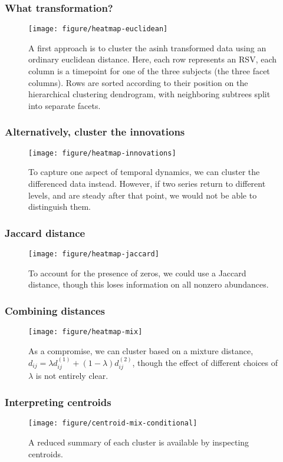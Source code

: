\documentclass{beamer}
\begin{document}
\begin{frame}
  \frametitle{What transformation?}
 \begin{figure}
   \centering
   \texttt{[image: figure/heatmap-euclidean]}
   \caption{A first approach is to cluster the asinh transformed data using an
     ordinary euclidean distance. Here, each row represents an RSV, each column
     is a timepoint for one of the three subjects (the three facet columns).
     Rows are sorted according to their position on the hierarchical
     clustering dendrogram, with neighboring subtrees split into separate
     facets. \label{fig:heatmap-euclidean}}
 \end{figure}
\end{frame}

\begin{frame}
  \frametitle{Alternatively, cluster the innovations}
 \begin{figure}[ht]
   \centering
   \texttt{[image: figure/heatmap-innovations]}
   \caption{To capture one aspect of temporal dynamics, we can cluster the
     differenced data instead. However, if two series return to different
     levels, and are steady after that point, we would not be able to
     distinguish them. \label{fig:heatmap-innovations} }
 \end{figure}
\end{frame}

\begin{frame}
  \frametitle{Jaccard distance}
 \begin{figure}[ht]
   \centering
   \texttt{[image: figure/heatmap-jaccard]}
   \caption{To account for the presence of zeros, we could use a Jaccard
     distance, though this loses information on all nonzero abundances.
     \label{fig:heatmap-jaccard} }
 \end{figure}
\end{frame}

\begin{frame}
  \frametitle{Combining distances}
 \begin{figure}[ht]
   \centering
   \texttt{[image: figure/heatmap-mix]}
   \caption{As a compromise, we can cluster based on a mixture distance, $d_{ij}
     = \lambda d^{(1)}_{ij} + \left(1 - \lambda\right)d^{(2)}_{ij}$, though the
    effect of different choices of $\lambda$ is not entirely clear.
     \label{fig:heatmap-jaccard} }
 \end{figure}
\end{frame}

\begin{frame}
  \frametitle{Interpreting centroids}
\begin{figure}[ht]
  \centering
  \texttt{[image: figure/centroid-mix-conditional]}
  \caption{A reduced summary of each cluster is available by inspecting
    centroids. \label{fig:centroid-mix-conditional} }
\end{figure}
\end{frame}
\end{document}
